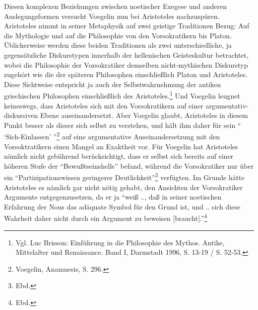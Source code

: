 Diesen komplexen Beziehungen zwischen noetischer Exegese und anderen
Auslegungsformen versucht Voegelin nun bei Aristoteles nachzuspüren.
Aristoteles nimmt in seiner Metaphysik auf zwei geistige Traditionen Bezug:
Auf die Mythologie und auf die Philosophie von den Vorsokratikern bis Platon.
Üblicherweise werden diese beiden Traditionen als zwei unterschiedliche, ja
gegensätzliche Diskurstypen innerhalb der hellenischen Geisteskultur
betrachtet, wobei die Philosophie der Vorsokratiker demselben nicht-mythischen
Diskurstyp zugehört wie die der späteren Philosophen einschließlich Platon und
Aristoteles. Diese Sichtweise entspricht ja auch der Selbstwahrnehmung der
antiken griechischen Philosophen einschließlich des Aristoteles.\footnote{Vgl.
  Luc Brisson: Einführung in die Philosophie des Mythos. Antike, Mittelalter
  und Renaissance. Band I, Darmstadt 1996, S. 13-19 / S. 52-53.} Und Voegelin
leugnet keineswegs, dass Aristoteles sich mit den Vorsokratikern auf einer
argumentativ-diskursiven Ebene auseinandersetzt.  Aber Voegelin glaubt,
Aristoteles in diesem Punkt besser als dieser sich selbst zu verstehen, und
hält ihm daher für sein "` `Sich-Einlassen' "'\footnote{Voegelin, Anamnesis,
  S. 296.} auf eine argumentative Auseinandersetzung mit den Vorsoktratikern
einen Mangel an Exaktheit vor. Für Voegelin hat Aristoteles nämlich nicht
gebührend berücksichtigt, dass er selbst sich bereits auf einer höheren Stufe
der "`Bewußtseinshelle"' befand, während die Vorsokratiker nur über ein
"`Partizipationswissen geringerer Deutlichkeit"'\footnote{Ebd.} verfügten. Im
Grunde hätte Aristoteles es nämlich gar nicht nötig gehabt, den Ansichten der
Vorsokratiker Argumente entgegenzusetzen, da er ja "`weiß .., daß in seiner
noetischen Erfahrung der Nous das adäquate Symbol für den Grund ist, und ..
sich diese Wahrheit daher nicht durch ein Argument zu beweisen
[braucht]."'\footnote{Ebd.}

